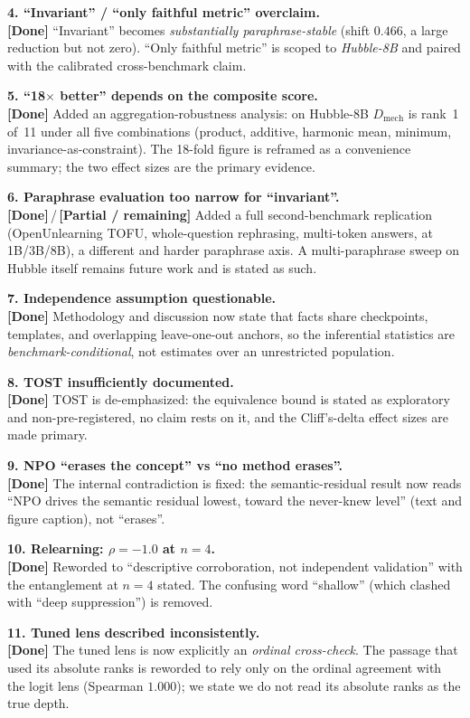 \documentclass[11pt,a4paper]{article}
\newcommand{\dmech}{\ensuremath{D_{\text{mech}}}}
\newcommand{\done}{\textbf{\textcolor{black!80}{[Done]}}}
\newcommand{\pend}{\textbf{\textcolor{black!55}{[Partial / remaining]}}}
\newcommand{\issue}[1]{\medskip\noindent\textbf{#1}\\}
\begin{document}
\issue{4. ``Invariant'' / ``only faithful metric'' overclaim.}
\done{} ``Invariant'' becomes \emph{substantially paraphrase-stable} (shift $0.466$, a large reduction but
not zero). ``Only faithful metric'' is scoped to \emph{Hubble-8B} and paired with the calibrated
cross-benchmark claim.

\issue{5. ``18$\times$ better'' depends on the composite score.}
\done{} Added an aggregation-robustness analysis: on Hubble-8B \dmech{} is rank~1 of~11 under all five
combinations (product, additive, harmonic mean, minimum, invariance-as-constraint). The 18-fold figure is
reframed as a convenience summary; the two effect sizes are the primary evidence.

\issue{6. Paraphrase evaluation too narrow for ``invariant''.}
\done{}\,/\,\pend{} Added a full second-benchmark replication (OpenUnlearning TOFU, whole-question
rephrasing, multi-token answers, at 1B/3B/8B), a different and harder paraphrase axis. A multi-paraphrase
sweep on Hubble itself remains future work and is stated as such.

\issue{7. Independence assumption questionable.}
\done{} Methodology and discussion now state that facts share checkpoints, templates, and overlapping
leave-one-out anchors, so the inferential statistics are \emph{benchmark-conditional}, not estimates over
an unrestricted population.

\issue{8. TOST insufficiently documented.}
\done{} TOST is de-emphasized: the equivalence bound is stated as exploratory and non-pre-registered, no
claim rests on it, and the Cliff's-delta effect sizes are made primary.

\issue{9. NPO ``erases the concept'' vs ``no method erases''.}
\done{} The internal contradiction is fixed: the semantic-residual result now reads ``NPO drives the
semantic residual lowest, toward the never-knew level'' (text and figure caption), not ``erases''.

\issue{10. Relearning: $\rho=-1.0$ at $n=4$.}
\done{} Reworded to ``descriptive corroboration, not independent validation'' with the entanglement at
$n=4$ stated. The confusing word ``shallow'' (which clashed with ``deep suppression'') is removed.

\issue{11. Tuned lens described inconsistently.}
\done{} The tuned lens is now explicitly an \emph{ordinal cross-check}. The passage that used its absolute
ranks is reworded to rely only on the ordinal agreement with the logit lens (Spearman $1.000$); we state we
do not read its absolute ranks as the true depth.
\end{document}
